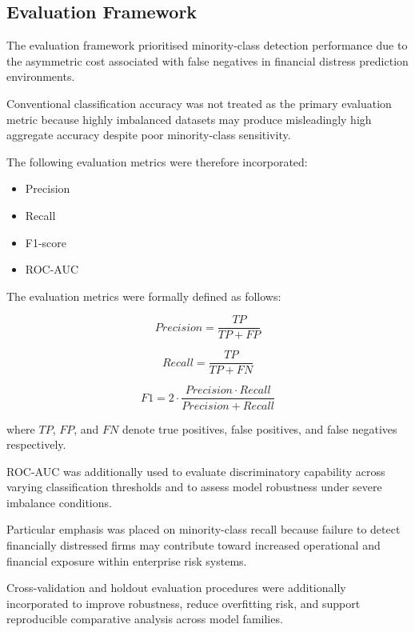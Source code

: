 \documentclass{article}
\begin{document}
\subsection{Evaluation Framework}

The evaluation framework prioritised minority-class detection performance due to the asymmetric cost associated with false negatives in financial distress prediction environments.

Conventional classification accuracy was not treated as the primary evaluation metric because highly imbalanced datasets may produce misleadingly high aggregate accuracy despite poor minority-class sensitivity.

The following evaluation metrics were therefore incorporated:

\begin{itemize}
    \item Precision
    \item Recall
    \item F1-score
    \item ROC-AUC
\end{itemize}

The evaluation metrics were formally defined as follows:

\begin{equation}
Precision = \frac{TP}{TP + FP}
\end{equation}

\begin{equation}
Recall = \frac{TP}{TP + FN}
\end{equation}

\begin{equation}
F1 = 2 \cdot \frac{Precision \cdot Recall}{Precision + Recall}
\end{equation}

where \(TP\), \(FP\), and \(FN\) denote true positives, false positives, and false negatives respectively.

ROC-AUC was additionally used to evaluate discriminatory capability across varying classification thresholds and to assess model robustness under severe imbalance conditions.


Particular emphasis was placed on minority-class recall because failure to detect financially distressed firms may contribute toward increased operational and financial exposure within enterprise risk systems.

Cross-validation and holdout evaluation procedures were additionally incorporated to improve robustness, reduce overfitting risk, and support reproducible comparative analysis across model families.
\end{document}
